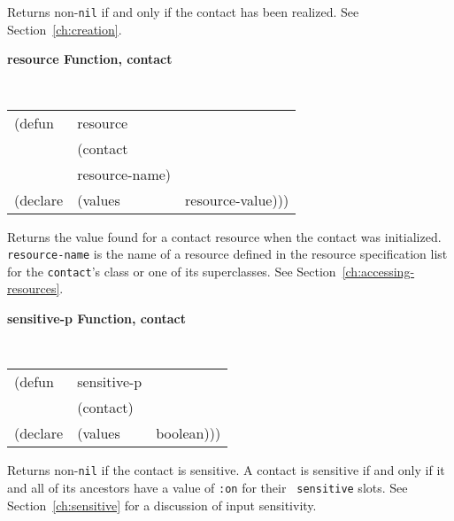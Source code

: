 \begin{flushright} \parbox[t]{6.125in}{
Returns non-{\tt nil} if and only if the contact has been realized.
See Section~\ref{ch:creation}.

}\end{flushright}


{\samepage
{\large {\bf resource \hfill Function, contact}}
\begin{flushright} \parbox[t]{6.125in}{
\tt
\begin{tabular}{lll}
\raggedright
(defun & resource & \\
& (contact\\
& resource-name) \\
(declare &(values &resource-value)))
\end{tabular}
\rm

}\end{flushright}}

\begin{flushright} \parbox[t]{6.125in}{
Returns the value found for a contact resource when the contact was initialized.
{\tt resource-name} is the name of a resource defined in the resource
specification list for the {\tt contact}'s class or one of its superclasses.
See Section~\ref{ch:accessing-resources}.

}\end{flushright}


{\samepage
{\large {\bf sensitive-p \hfill Function, contact}} 
\begin{flushright} \parbox[t]{6.125in}{
\tt
\begin{tabular}{lll}
\raggedright
(defun & sensitive-p & \\ 
& (contact) \\
(declare &(values  & boolean)))
\end{tabular}
\rm

}\end{flushright}}

\begin{flushright} \parbox[t]{6.125in}{
Returns non-{\tt nil} if the contact is sensitive. 
A contact is sensitive if and
only if it and all of its ancestors have a value  of {\tt :on} for their {\tt
sensitive} slots.
See
Section~\ref{ch:sensitive} for a discussion of input sensitivity.

}\end{flushright}



